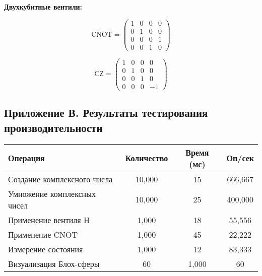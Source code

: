 \documentclass[14pt,russian]{extarticle}
\begin{document}
\textbf{Двухкубитные вентили:}

$$\text{CNOT} = \begin{pmatrix} 
1 & 0 & 0 & 0 \\
0 & 1 & 0 & 0 \\
0 & 0 & 0 & 1 \\
0 & 0 & 1 & 0
\end{pmatrix}$$

$$\text{CZ} = \begin{pmatrix} 
1 & 0 & 0 & 0 \\
0 & 1 & 0 & 0 \\
0 & 0 & 1 & 0 \\
0 & 0 & 0 & -1
\end{pmatrix}$$

\subsection{Приложение В. Результаты тестирования производительности}

\begin{tabular}{|l|c|c|c|}
\hline
\textbf{Операция} & \textbf{Количество} & \textbf{Время (мс)} & \textbf{Оп/сек} \\
\hline
Создание комплексного числа & 10,000 & 15 & 666,667 \\
Умножение комплексных чисел & 10,000 & 25 & 400,000 \\
Применение вентиля H & 1,000 & 18 & 55,556 \\
Применение CNOT & 1,000 & 45 & 22,222 \\
Измерение состояния & 1,000 & 12 & 83,333 \\
Визуализация Блох-сферы & 60 & 1,000 & 60 \\
\hline
\end{tabular}
\end{document}
